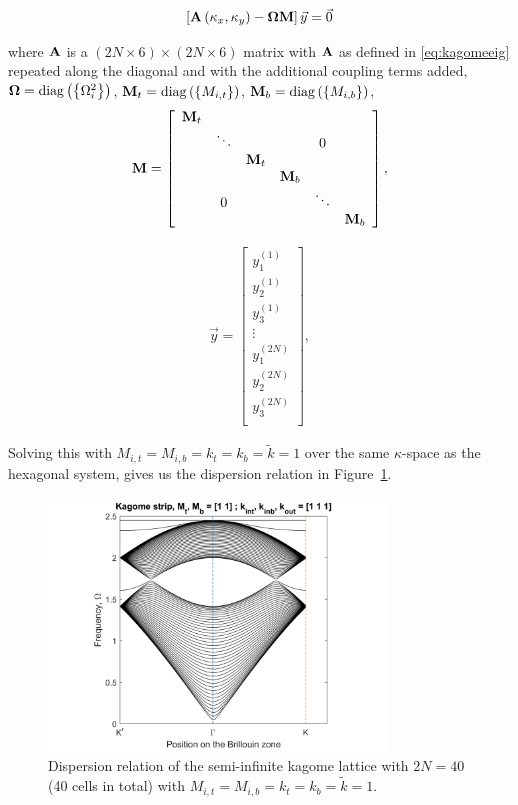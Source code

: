 \begin{align}
  \left[\mathbf{A}\left(\kappa_{x},\kappa_{y}\right)-\mathbf{\Omega}\mathbf{M}\right]\vec{y}=\vec{0}
\label{eq:kagomestripeig}
\end{align}

where $\mathbf{A}$ is a $(2N \times 6) \times (2N \times 6)$ matrix with
$\mathbf{A}$ as defined in \eqref{eq:kagomeeig} repeated along the diagonal and
with the additional coupling terms added,
$\mathbf{\Omega}=\operatorname{diag}\left(\left\{\Omega_i^2\right\}\right)$,
$\mathbf{M}_{t}=\operatorname{diag}\left(\left\{M_{i,t}\right\}\right)$,
$\mathbf{M}_{b}=\operatorname{diag}\left(\left\{M_{i,b}\right\}\right)$,
\begin{align}
\mathbf{M}=\left[
\begin{array}{cccccc}
\mathbf{M}_{t}\\
 & \ddots &  &  & 0\\
 &  & \mathbf{M}_{t}\\
 &  &  & \mathbf{M}_{b}\\
 & 0 &  &  & \ddots\\
 &  &  &  &  & \mathbf{M}_{b}
\end{array}\right],
\end{align}

\begin{align}
\vec{y}=\left[
\begin{array}{c}
y_1^{(1)}\\
y_2^{(1)}\\
y_3^{(1)}\\
\vdots\\
y_1^{(2N)}\\
y_2^{(2N)}\\
y_3^{(2N)}\\
\end{array}\right],
\end{align}

Solving this with $M_{i,t}=M_{i,b}=k_t=k_b=\tilde{k}=1$ over the same
$\kappa$-space as the hexagonal system, gives us the dispersion relation in
Figure~\ref{fig:kagomestripdisper}.

\begin{figure}[!h]
\centering
\includegraphics[width=0.8\textwidth]{imgs/kagomestrip.png}
\caption{\label{fig:kagomestripdisper} Dispersion relation of the semi-infinite
  kagome lattice with $2N=40$ (40 cells in total) with
  $M_{i,t}=M_{i,b}=k_t=k_b=\tilde{k}=1$.}
\end{figure}

